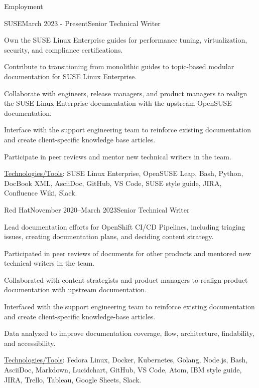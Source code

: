 \documentclass{resume} %
\begin{document}
\begin{rSection}{Employment}

\begin{rSubsection}{SUSE}{March 2023 - Present}{Senior Technical Writer}{}
\item Own the SUSE Linux Enterprise guides for performance tuning, virtualization, security, and compliance certifications.
\item Contribute to transitioning from monolithic guides to topic-based modular documentation for SUSE Linux Enterprise.
\item Collaborate with engineers, release managers, and product managers to realign the SUSE Linux Enterprise documentation with the upstream OpenSUSE documentation.
\item Interface with the support engineering team to reinforce existing documentation and create client-specific knowledge base articles.
\item Participate in peer reviews and mentor new technical writers in the team. 
\item \underline{Technologies/Tools}: SUSE Linux Enterprise, OpenSUSE Leap, Bash, Python, DocBook XML, AsciiDoc, GitHub, VS Code, SUSE style guide, JIRA, Confluence Wiki, Slack. 
\end{rSubsection}


\begin{rSubsection}{Red Hat}{November 2020–March 2023}{Senior Technical Writer}{}
\item Lead documentation efforts for OpenShift CI/CD Pipelines, including triaging issues, creating documentation plans, and deciding content strategy.
\item Participated in peer reviews of documents for other products and mentored new technical writers in the team. 
\item Collaborated with content strategists and product managers to realign product documentation with upstream documentation.
\item Interfaced with the support engineering team to reinforce existing documentation and create client-specific knowledge-base articles.
\item Data analyzed to improve documentation coverage, flow, architecture, findability, and accessibility. 
\item \underline{Technologies/Tools}: Fedora Linux, Docker, Kubernetes, Golang, Node.js, Bash, AsciiDoc, Markdown, Lucidchart, GitHub, VS Code, Atom, IBM style guide, JIRA, Trello, Tableau, Google Sheets, Slack. 
\end{rSubsection}


\end{rSection}
\end{document}
